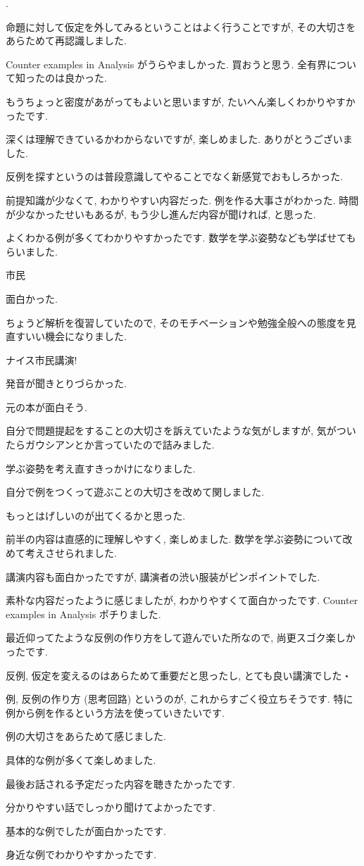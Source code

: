 \documentclass[openany, a4paper, oneside]{book}
\newcounter{enum2}
\renewenvironment{enumerate}{%
\begin{list}%
{%
\arabic{enum2}.\ \,%
}%
{%
\usecounter{enum2}
\setlength{\itemindent}{0pt}%
\setlength{\leftmargin}{6pt}%
\setlength{\rightmargin}{0pt}%
\setlength{\labelsep}{0pt}%
\setlength{\labelwidth}{6pt}%
\setlength{\itemsep}{0pt}%
\setlength{\parsep}{0pt}%
\setlength{\listparindent}{0pt}%
}
}{%
\end{list}%
}
\theoremstyle{break}
\theoremstyle{breakdefn}
\begin{document}
\begin{enumerate}
\item 命題に対して仮定を外してみるということはよく行うことですが, その大切さをあらためて再認識しました.
\item Counter examples in Analysis がうらやましかった. 買おうと思う. 全有界について知ったのは良かった.
\item もうちょっと密度があがってもよいと思いますが, たいへん楽しくわかりやすかったです.
\item 深くは理解できているかわからないですが, 楽しめました. ありがとうございました.
\item 反例を探すというのは普段意識してやることでなく新感覚でおもしろかった.
\item 前提知識が少なくて, わかりやすい内容だった. 例を作る大事さがわかった. 時間が少なかったせいもあるが, もう少し進んだ内容が聞ければ, と思った.
\item よくわかる例が多くてわかりやすかったです. 数学を学ぶ姿勢なども学ばせてもらいました.
\item 市民
\item 面白かった.
\item ちょうど解析を復習していたので, そのモチベーションや勉強全般への態度を見直すいい機会になりました.
\item ナイス市民講演!
\item 発音が聞きとりづらかった.
\item 元の本が面白そう.
\item 自分で問題提起をすることの大切さを訴えていたような気がしますが, 気がついたらガウシアンとか言っていたので詰みました.
\item 学ぶ姿勢を考え直すきっかけになりました.
\item 自分で例をつくって遊ぶことの大切さを改めて関しました.
\item もっとはげしいのが出てくるかと思った.
\item 前半の内容は直感的に理解しやすく, 楽しめました. 数学を学ぶ姿勢について改めて考えさせられました.
\item 講演内容も面白かったですが, 講演者の渋い服装がピンポイントでした.
\item 素朴な内容だったように感じましたが, わかりやすくて面白かったです. Counter examples in Analysis ポチりました.
\item 最近仰ってたような反例の作り方をして遊んでいた所なので, 尚更スゴク楽しかったです.
\item 反例, 仮定を変えるのはあらためて重要だと思ったし, とても良い講演でした・
\item 例, 反例の作り方 (思考回路) というのが, これからすごく役立ちそうです. 特に例から例を作るという方法を使っていきたいです.
\item 例の大切さをあらためて感じました.
\item 具体的な例が多くて楽しめました.
\item 最後お話される予定だった内容を聴きたかったです.
\item 分かりやすい話でしっかり聞けてよかったです.
\item 基本的な例でしたが面白かったです.
\item 身近な例でわかりやすかったです.
\end{enumerate}
\end{document}
